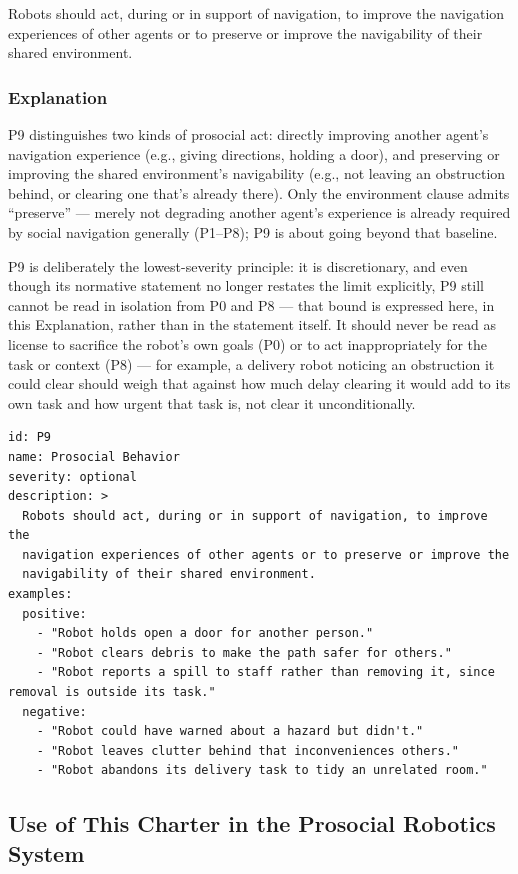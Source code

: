\documentclass[utf8]{frontiers_suppmat} %
\begin{document}
Robots should act, during or in support of navigation, to improve the
navigation experiences of other agents or to preserve or improve the
navigability of their shared environment.

\subsubsection{Explanation}\label{explanation-9}

P9 distinguishes two kinds of prosocial act: directly improving another
agent's navigation experience (e.g., giving directions, holding a door),
and preserving or improving the shared environment's navigability (e.g.,
not leaving an obstruction behind, or clearing one that's already
there). Only the environment clause admits ``preserve'' --- merely not
degrading another agent's experience is already required by social
navigation generally (P1--P8); P9 is about going beyond that baseline.

P9 is deliberately the lowest-severity principle: it is discretionary,
and even though its normative statement no longer restates the limit
explicitly, P9 still cannot be read in isolation from P0 and P8 --- that
bound is expressed here, in this Explanation, rather than in the
statement itself. It should never be read as license to sacrifice the
robot's own goals (P0) or to act inappropriately for the task or context
(P8) --- for example, a delivery robot noticing an obstruction it could
clear should weigh that against how much delay clearing it would add to
its own task and how urgent that task is, not clear it unconditionally.

\begin{lstlisting}[style=literatecard]
id: P9
name: Prosocial Behavior
severity: optional
description: >
  Robots should act, during or in support of navigation, to improve the
  navigation experiences of other agents or to preserve or improve the
  navigability of their shared environment.
examples:
  positive:
    - "Robot holds open a door for another person."
    - "Robot clears debris to make the path safer for others."
    - "Robot reports a spill to staff rather than removing it, since removal is outside its task."
  negative:
    - "Robot could have warned about a hazard but didn't."
    - "Robot leaves clutter behind that inconveniences others."
    - "Robot abandons its delivery task to tidy an unrelated room."
\end{lstlisting}

\subsection{Use of This Charter in the Prosocial Robotics
System}\label{use-of-this-charter-in-the-prosocial-robotics-system}
\end{document}
